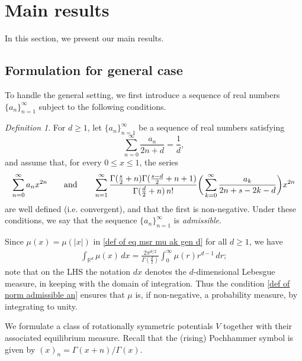 \documentclass[10pt]{amsart}
\def\R{\mathbb{R}}
\theoremstyle{plain}
\theoremstyle{remark}
\newtheorem{defn}{Definition}
\numberwithin{equation}{section}
\begin{document}
 


\section{Main results}

In this section, we present our main results. 

\subsection{Formulation for general case}\label{S1.1}

To handle the general setting, we first introduce a sequence of real numbers $\{a_n\}_{n=1}^\infty$ subject to the following conditions.


\begin{defn}
For $d \ge 1$, let $\{a_n\}_{n=1}^\infty$ be a sequence of real numbers satisfying
\begin{equation} \label{def of norm admissible an}
\sum_{n=0}^\infty \frac{a_n}{2n+d} = \frac{1}{d},
\end{equation}
and assume that, for every $0 \le x \le 1$, the series
\begin{equation} \label{def of seq conv for admissible an}
\sum_{n=0}^\infty a_n x^{2n} \qquad \textup{and} \qquad  \sum_{n=1}^\infty \frac{ \Gamma(\frac{s}{2}+n) \Gamma( \frac{s-d}{2}+n+1 )  }{ \Gamma(\frac{d}{2}+n) \, n! } \bigg( \sum_{k=0}^\infty \frac{ a_k}{ 2n+s-2k-d } \bigg) x^{2n} 
\end{equation}
are well defined (i.e. convergent), and that the first is non-negative.
Under these conditions, we say that the sequence $\{a_n\}_{n=1}^\infty$ is \textit{admissible}.
\end{defn}

Since $\mu(x)= \mu(|x|)$  in \eqref{def of eq msr mu ak gen d} for all $d \ge 1$, we have   
\begin{align}
\int_{ \R^d } \mu(x)\,dx = \frac{2 \pi^{ d/2 } }{ \Gamma(\frac{d}{2}) } \int_0^\infty  \mu (r)r^{d-1}\,dr; 
\end{align} 
note that on the LHS the notation $dx$ denotes the
$d$-dimensional Lebesgue measure, in keeping with the domain of integration. 
Thus the condition \eqref{def of norm admissible an} ensures that $\mu$ is, if non-negative, a probability measure, by integrating to unity. 

We formulate a class of rotationally symmetric potentials $V$ together with their associated equilibrium measure. Recall that the (rising) Pochhammer symbol is given by $(x)_n=\Gamma(x+n)/\Gamma(x)$. 
\end{document}
